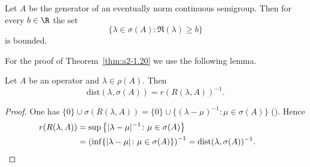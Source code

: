 \begin{theorem}\label{thm:a2-1.20}
Let $A$ be the generator of an eventually norm continuous semigroup.
Then for every $b \in \R$ the set
\[
    \{\lambda \in \sigma(A) \colon \Re(\lambda) \geq b\}
\]
is bounded.
\end{theorem}
For the proof of Theorem~\ref{thm:a2-1.20} we use the following lemma.
\begin{lemma}\label{lem:a2-1.21}
Let $A$ be an operator and $\lambda \in \rho(A)$.
Then
\[
    \mathrm{dist}(\lambda,\sigma(A)) = r(R(\lambda,A))^{-1}.
\]
\end{lemma}
\begin{proof}
One has $\{0\} \cup \sigma(R(\lambda,A)) = \{0\} \cup \{(\lambda-\mu)^{-1} \colon \mu \in \sigma(A)\}$ (\textcite[Lemma~ 2.11]{davies:1980}).
Hence 
\begin{align*}
r(R(\lambda,A)) &= \sup \left\{|\lambda-\mu|^{-1} \colon \mu \in \sigma(A)\right\} \\
& = 
\left(\inf \{|\lambda-\mu| \colon \mu \in \sigma(A)\}\right)^{-1} = \text{dist}(\lambda,\sigma(A))^{-1}.
&&\qedhere
\end{align*}
\end{proof}
